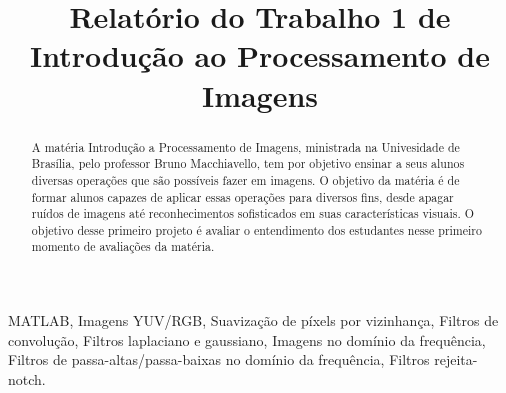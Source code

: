 \documentclass[conference]{IEEEtran}
\begin{document}

\title{Relatório do Trabalho 1 de Introdução ao Processamento de Imagens\\}

\author{
}

\maketitle


\begin{abstract}
A matéria Introdução a Processamento de Imagens, ministrada na Univesidade de Brasília, pelo professor Bruno Macchiavello, tem por objetivo ensinar a seus alunos diversas operações que são possíveis fazer em imagens. O objetivo da matéria é de formar alunos capazes de aplicar essas operações para diversos fins, desde apagar ruídos de imagens até reconhecimentos sofisticados em suas características visuais. O objetivo desse primeiro projeto é avaliar o entendimento dos estudantes nesse primeiro momento de avaliações da matéria.
\end{abstract}

\begin{IEEEkeywords}
MATLAB, Imagens YUV/RGB, Suavização de píxels por vizinhança, Filtros de convolução, Filtros laplaciano e gaussiano, Imagens no domínio da frequência, Filtros de passa-altas/passa-baixas no domínio da frequência, Filtros rejeita-notch.
\end{IEEEkeywords}

\end{document}
